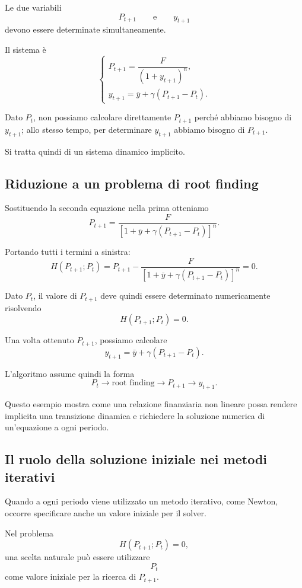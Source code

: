 \documentclass{book}
\begin{document}
Le due variabili
\[
P_{t+1}
\qquad\text{e}\qquad
y_{t+1}
\]
devono essere determinate simultaneamente.

Il sistema è
\[
\begin{cases}
P_{t+1}
=
\dfrac{F}{(1+y_{t+1})^n},\\[3mm]
y_{t+1}
=
\bar{y}
+
\gamma(P_{t+1}-P_t).
\end{cases}
\]

Dato $P_t$, non possiamo calcolare direttamente $P_{t+1}$ perché abbiamo
bisogno di $y_{t+1}$; allo stesso tempo, per determinare $y_{t+1}$ abbiamo
bisogno di $P_{t+1}$.

Si tratta quindi di un sistema dinamico implicito.


\subsection{Riduzione a un problema di root finding}

Sostituendo la seconda equazione nella prima otteniamo
\[
P_{t+1}
=
\frac{F}
{
\left[
1+\bar{y}
+
\gamma(P_{t+1}-P_t)
\right]^n
}.
\]

Portando tutti i termini a sinistra:
\[
H(P_{t+1};P_t)
=
P_{t+1}
-
\frac{F}
{
\left[
1+\bar{y}
+
\gamma(P_{t+1}-P_t)
\right]^n
}
=
0.
\]

Dato $P_t$, il valore di $P_{t+1}$ deve quindi essere determinato
numericamente risolvendo
\[
H(P_{t+1};P_t)=0.
\]

Una volta ottenuto $P_{t+1}$, possiamo calcolare
\[
y_{t+1}
=
\bar{y}
+
\gamma(P_{t+1}-P_t).
\]

L'algoritmo assume quindi la forma
\[
P_t
\longrightarrow
\boxed{\text{root finding}}
\longrightarrow
P_{t+1}
\longrightarrow
y_{t+1}.
\]

Questo esempio mostra come una relazione finanziaria non lineare possa
rendere implicita una transizione dinamica e richiedere la soluzione
numerica di un'equazione a ogni periodo.


\subsection{Il ruolo della soluzione iniziale nei metodi iterativi}

Quando a ogni periodo viene utilizzato un metodo iterativo, come Newton,
occorre specificare anche un valore iniziale per il solver.

Nel problema
\[
H(P_{t+1};P_t)=0,
\]
una scelta naturale può essere utilizzare
\[
P_t
\]
come valore iniziale per la ricerca di $P_{t+1}$.
\end{document}
